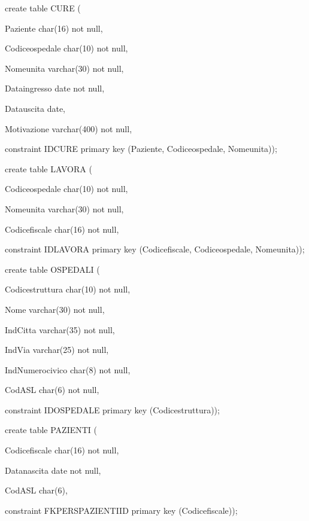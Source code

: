 \documentclass[a4paper,12pt]{report}
\begin{document}
\noindent create table CURE (
     
     Paziente char(16) not null,
     
     Codice\textunderscore ospedale char(10) not null,
     
     Nome\textunderscore unita varchar(30) not null,
     
     Data\textunderscore ingresso date not null,
     
     Data\textunderscore uscita date,
     
     Motivazione varchar(400) not null,
     
     constraint IDCURE primary key (Paziente, Codice\textunderscore ospedale, Nome\textunderscore unita)); \newline

\noindent create table LAVORA (

     Codice\textunderscore ospedale char(10) not null,
  
     Nome\textunderscore unita varchar(30) not null,
  
     Codice\textunderscore fiscale char(16) not null,
  
     constraint IDLAVORA primary key (Codice\textunderscore fiscale, Codice\textunderscore ospedale, Nome\textunderscore unita)); \newline

\noindent create table OSPEDALI (

     Codice\textunderscore struttura char(10) not null,
  
     Nome varchar(30) not null,
  
     Ind\textunderscore Citta varchar(35) not null,
  
     Ind\textunderscore Via varchar(25) not null,
  
     Ind\textunderscore Numero\textunderscore civico char(8) not null,
  
     Cod\textunderscore ASL char(6) not null,
  
     constraint IDOSPEDALE primary key (Codice\textunderscore struttura)); \newline

\noindent create table PAZIENTI (

     Codice\textunderscore fiscale char(16) not null,
  
     Data\textunderscore nascita date not null,
  
     Cod\textunderscore ASL char(6),
  
     constraint FKPERS\textunderscore PAZIENTI\textunderscore ID primary key (Codice\textunderscore fiscale)); \newline
\end{document}
